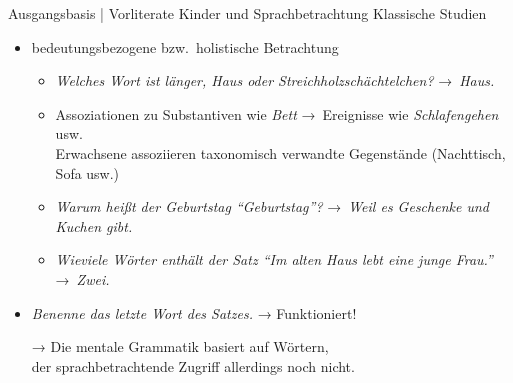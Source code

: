 \begin{frame}
  {Ausgangsbasis | Vorliterate Kinder und Sprachbetrachtung}
  \onslide<+->
  \onslide<+->
  Klassische Studien \\
  \Halbzeile
  \begin{itemize}[<+->]
    \item \alert{bedeutungsbezogene} bzw.\ \alert{holistische} Betrachtung
      \Viertelzeile
      \begin{itemize}
        \item \textit{Welches Wort ist länger, Haus oder Streichholzschächtelchen?} →\ \textit{Haus.}
          \Viertelzeile
        \item Assoziationen zu Substantiven wie \textit{Bett} →\ \alert{Ereignisse} wie \textit{Schlafengehen} usw.\\
          Erwachsene assoziieren \alert{taxonomisch verwandte Gegenstände} (Nachttisch, Sofa usw.)
          \Viertelzeile
        \item \textit{Warum heißt der Geburtstag  "`Geburtstag"'?} →\ \textit{Weil es Geschenke und Kuchen gibt.}
          \Viertelzeile
        \item \textit{Wieviele Wörter enthält der Satz "`Im alten Haus lebt eine junge Frau."'} →\ \textit{Zwei.}
      \end{itemize}
      \Halbzeile
    \item \textit{Benenne das letzte Wort des Satzes.} → Funktioniert!
      \Halbzeile
    \item[→] Die mentale Grammatik basiert auf Wörtern,\\
      der sprachbetrachtende Zugriff allerdings noch nicht.
  \end{itemize}
\end{frame}

